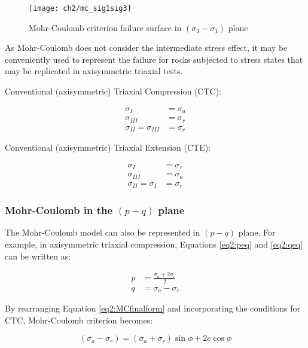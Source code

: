 \begin{figure}[tb]
    \centering
    \texttt{[image: ch2/mc\_sig1sig3]}
    \caption{Mohr-Coulomb criterion failure surface in  $(\sigma_3 -\sigma_1)$ plane}
    \label{fig2:mc_sig1sig3}
\end{figure}

As Mohr-Coulomb does not consider the intermediate stress effect, it may be conveniently used to represent the failure for rocks subjected to stress states that may be replicated in axisymmetric triaxial tests.

Conventional (axisymmetric) Triaxial Compression (CTC): 

\begin{align}
    \sigma_I &= \sigma_a \\
    \sigma_{III} &= \sigma_r\\
    \sigma_{II} = \sigma_{III} &= \sigma_r
\end{align}

Conventional (axisymmetric) Triaxial Extension (CTE):

\begin{align}
    \sigma_I &= \sigma_r \\
    \sigma_{III} &= \sigma_a\\
    \sigma_{II} = \sigma_{I} &= \sigma_r
\end{align}

\subsubsection{Mohr-Coulomb in the \texorpdfstring{$(p - q)$}{p - q} plane} \label{ch2:MC-pq}

The Mohr-Coulomb model can also be represented in $(p-q)$ plane. For example, in axisymmetric triaxial compression, Equations \ref{eq2:peq} and \ref{eq2:qeq} can be written as: 

\begin{align}
    p &= \frac{\sigma_a+2\sigma_r}{2} \label{eq2:p2} \\
    q &= \sigma_a - \sigma_r \label{eq2:q2}
\end{align}

By rearranging Equation \ref{eq2:MCfinalform} and incorporating the conditions for CTC, Mohr-Coulomb criterion becomes:

\begin{equation}\label{eq2:MCcrit}
    \left(\sigma_a - \sigma_r\right) = \left(\sigma_a+\sigma_r\right)\sin \phi + 2 c\cos \phi
\end{equation}

